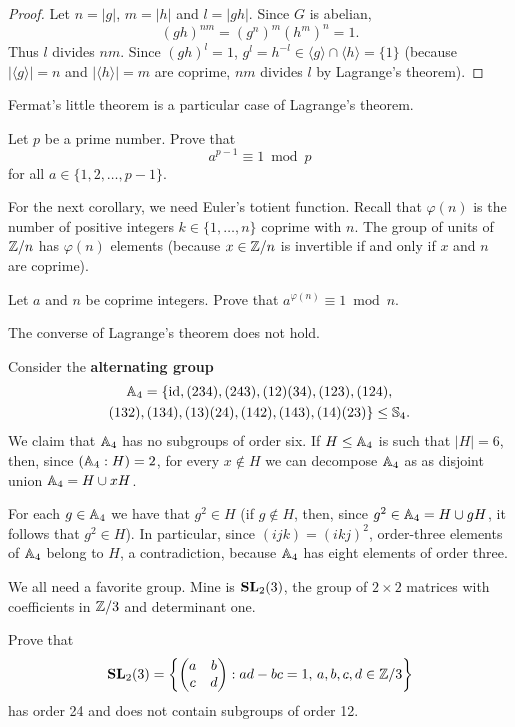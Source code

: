\begin{proof}
    Let $n=|g|$, $m=|h|$ and $l=|gh|$. Since $G$ is abelian,
    \[
    (gh)^{nm}=(g^n)^m(h^m)^n=1. 
    \]
    Thus $l$ divides $nm$. Since $(gh)^l=1$,
    $g^l=h^{-l}\in \langle g\rangle\cap\langle h\rangle=\{1\}$ 
    (because $|\langle g\rangle|=n$ and $|\langle h\rangle|=m$ are coprime, 
    $nm$ divides $l$ by Lagrange's theorem).
\end{proof}

Fermat's little theorem is a particular case of Lagrange's theorem. 

\begin{exercise}
    Let $p$ be a prime number. Prove that 
    \[a^{p-1}\equiv1\bmod p
    \]
    for all $a\in\{1,2,\dots,p-1\}$.
\end{exercise}

For the next corollary, we need Euler's totient function. 
Recall that 
$\varphi(n)$ is the number of positive integers $k\in\{1,\dots,n\}$
coprime with $n$. The group of units of 
$\mathbb{Z}/n$ has $\varphi(n)$ elements (because $x\in\mathbb{Z}/n$ is invertible
if and only if $x$ and $n$ are coprime).

\begin{exercise}
        Let $a$ and $n$ be coprime integers. Prove that 
        $a^{\varphi(n)}\equiv1\bmod n$.
\end{exercise}

The converse of Lagrange's theorem does not hold.   

\begin{example}
Consider the \textbf{alternating group}
    \begin{multline*}
\mathbb{A}_4=\{\operatorname{id},(234),(243),(12)(34),(123),(124),\\(132),(134),(13)(24),(142),(143),(14)(23)\}\leq\mathbb{S}_4.
\end{multline*}
We claim that $\mathbb{A}_4$ has no subgroups of order six. If $H\leq\mathbb{A}_4$ is such that 
$|H|=6$, then, since $(\mathbb{A}_4:H)=2$, for every $x\not\in H$ we can decompose $\mathbb{A}_4$ as 
as disjoint union 
$\mathbb{A}_4=H\cup xH$.

For each $g\in\mathbb{A}_4$ we have that $g^2\in H$ (if $g\not\in H$, then, since $g^2\in\mathbb{A}_4=H\cup
gH$, it follows that $g^2\in H$). In particular, since 
$(ijk)=(ikj)^2$, order-three elements of $\mathbb{A}_4$ belong to $H$, a contradiction, 
because $\mathbb{A}_4$ has eight elements of order three. 
\end{example}

We all need a favorite group. Mine is $\mathbf{SL}_2(3)$,
the group of $2\times2$ matrices with coefficients in $\mathbb{Z}/3$
and determinant one. 

\begin{exercise}
Prove that    \[
    \mathbf{SL}_2(3)=\left\{\begin{pmatrix}a&b\\c&d\end{pmatrix}:ad-bc=1,\,a,b,c,d\in\mathbb{Z}/3\right\}
    \]
    has order 24 and does not contain subgroups of order 12.
    \end{exercise}

